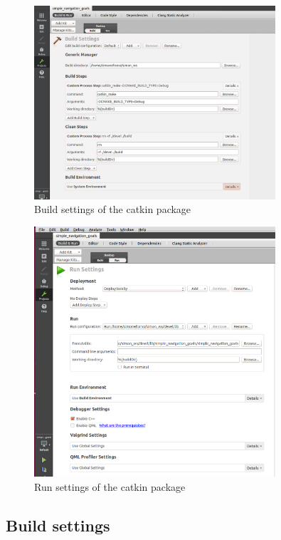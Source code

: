\documentclass[11pt,a4paper]{article}
\begin{document}
\begin{figure}[!htb]
	\center
	\includegraphics[width=0.8\textwidth]{figures/build_settings.png}
	\caption{Build settings of the catkin package}
	\label{fig:build}
\end{figure}

\begin{figure}[!htb]
	\center
	\includegraphics[width=0.8\textwidth]{figures/run_settings.png}
	\caption{Run settings of the catkin package}
	\label{fig:run}
\end{figure}

\subsection{Build settings}
\end{document}
